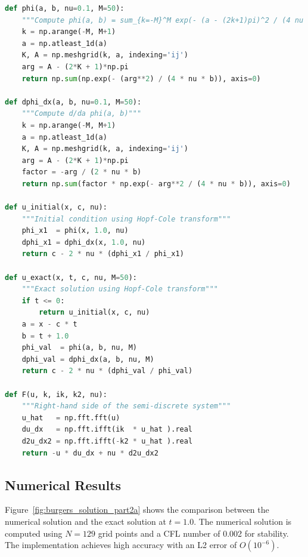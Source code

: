 \documentclass{article}
\begin{document}
\begin{lstlisting}[language=Python]
def phi(a, b, nu=0.1, M=50):
    """Compute phi(a, b) = sum_{k=-M}^M exp(- (a - (2k+1)pi)^2 / (4 nu b))"""
    k = np.arange(-M, M+1)
    a = np.atleast_1d(a)
    K, A = np.meshgrid(k, a, indexing='ij')
    arg = A - (2*K + 1)*np.pi
    return np.sum(np.exp(- (arg**2) / (4 * nu * b)), axis=0)

def dphi_dx(a, b, nu=0.1, M=50):
    """Compute d/da phi(a, b)"""
    k = np.arange(-M, M+1)
    a = np.atleast_1d(a)
    K, A = np.meshgrid(k, a, indexing='ij')
    arg = A - (2*K + 1)*np.pi
    factor = -arg / (2 * nu * b)
    return np.sum(factor * np.exp(- arg**2 / (4 * nu * b)), axis=0)

def u_initial(x, c, nu):
    """Initial condition using Hopf-Cole transform"""
    phi_x1  = phi(x, 1.0, nu)
    dphi_x1 = dphi_dx(x, 1.0, nu)
    return c - 2 * nu * (dphi_x1 / phi_x1)

def u_exact(x, t, c, nu, M=50):
    """Exact solution using Hopf-Cole transform"""
    if t <= 0:
        return u_initial(x, c, nu)
    a = x - c * t
    b = t + 1.0
    phi_val  = phi(a, b, nu, M)
    dphi_val = dphi_dx(a, b, nu, M)
    return c - 2 * nu * (dphi_val / phi_val)

def F(u, k, ik, k2, nu):
    """Right-hand side of the semi-discrete system"""
    u_hat   = np.fft.fft(u)
    du_dx   = np.fft.ifft(ik  * u_hat ).real
    d2u_dx2 = np.fft.ifft(-k2 * u_hat ).real
    return -u * du_dx + nu * d2u_dx2
\end{lstlisting}

\subsection*{Numerical Results}
Figure~\ref{fig:burgers_solution_part2a} shows the comparison between the numerical solution and the exact solution at $t=1.0$. The numerical solution is computed using $N=129$ grid points and a CFL number of 0.002 for stability. The implementation achieves high accuracy with an L2 error of $O(10^{-6})$.
\end{document}
